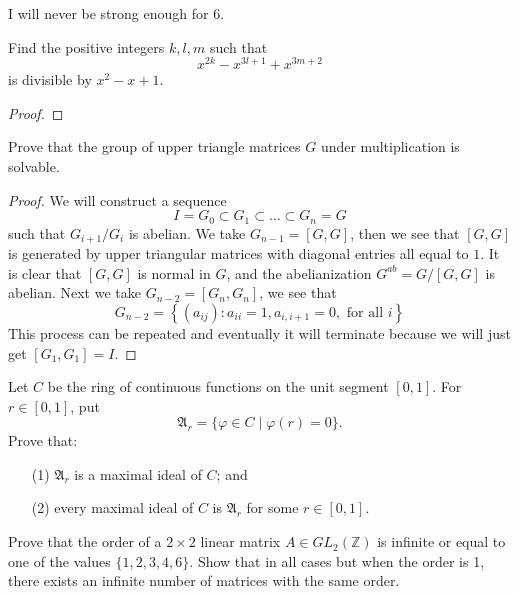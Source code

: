 \documentclass[openany]{book}
\begin{document}
I will never be strong enough for 6.



\begin{prob}
    Find the positive integers \(k, l, m\) such that 
    \[x^{2k} - x^{3l+1} + x^{3m+2}\] 
    is divisible by \(x^2 - x + 1\).
\end{prob}
\begin{proof}
    
\end{proof}



\begin{prob}
    Prove that the group of upper triangle matrices $G$ under multiplication is solvable.
\end{prob}
\begin{proof}
    We will construct a sequence 
    \begin{equation*}
        I=G_0\subset G_1\subset\dots \subset G_n=G
    \end{equation*}
    such that $G_{i+1}/G_i$ is abelian. We take $G_{n-1}=[G,G]$, then we see that $[G,G]$ is generated by upper triangular matrices with diagonal entries all equal to $1$. It is clear that $[G,G]$ is normal in $G$, and the abelianization $G^{ab}=G/[G,G]$ is abelian. Next we take $G_{n-2}=[G_n,G_n]$, we see that 
    \begin{equation*}
        G_{n-2}=\left\{(a_{ij}): a_{ii}=1, a_{i,i+1}=0, \text{ for all } i\right\}
    \end{equation*}
    This process can be repeated and eventually it will terminate because we will just get $[G_1,G_1]=I$.
\end{proof}




\begin{prob}
    Let \(C\) be the ring of continuous functions on the unit segment \([0,1]\). For \(r \in [0,1]\), put 
    \[\mathfrak{A}_r = \{\varphi \in C \mid \varphi(r) = 0\}.\]
    Prove that:
    \begin{itemize}
        \item[(1)] \(\mathfrak{A}_r\) is a maximal ideal of \(C\); and
        \item[(2)] every maximal ideal of \(C\) is \(\mathfrak{A}_r\) for some \(r \in [0,1]\).
    \end{itemize}
\end{prob}





\begin{prob}
    Prove that the order of a \(2 \times 2\) linear matrix \(A \in GL_2(\mathbb{Z})\) is infinite or equal to one of the values \(\{1, 2, 3, 4, 6\}\). Show that in all cases but when the order is 1, there exists an infinite number of matrices with the same order.
\end{prob}
\end{document}
